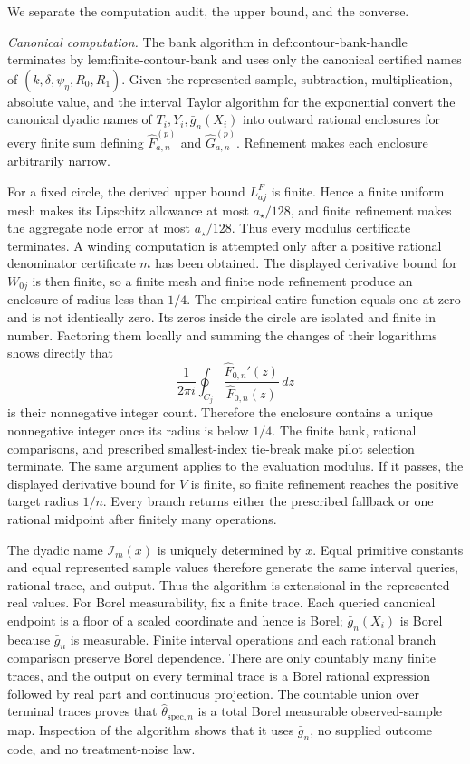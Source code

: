 We separate the computation audit, the upper bound, and the converse.

\emph{Canonical computation.}  The bank algorithm in \(\text{def:contour-bank-handle}\) terminates by \(\text{lem:finite-contour-bank}\) and uses only the canonical certified names of \((k,\delta,\psi_{\eta},R_0,R_1)\).  Given the represented sample, subtraction, multiplication, absolute value, and the interval Taylor algorithm for the exponential convert the canonical dyadic names of \(T_i,Y_i,\bar g_n(X_i)\) into outward rational enclosures for every finite sum defining \(\widehat F_{a,n}^{(p)}\) and \(\widehat G_{a,n}^{(p)}\).  Refinement makes each enclosure arbitrarily narrow.

For a fixed circle, the derived upper bound \(L^F_{aj}\) is finite.  Hence a finite uniform mesh makes its Lipschitz allowance at most \(a_{\star}/128\), and finite refinement makes the aggregate node error at most \(a_{\star}/128\).  Thus every modulus certificate terminates.  A winding computation is attempted only after a positive rational denominator certificate \(m\) has been obtained.  The displayed derivative bound for \(W_{0j}\) is then finite, so a finite mesh and finite node refinement produce an enclosure of radius less than \(1/4\).  The empirical entire function equals one at zero and is not identically zero.  Its zeros inside the circle are isolated and finite in number.  Factoring them locally and summing the changes of their logarithms shows directly that
\[
 \frac1{2\pi i}\oint_{C_j}
 \frac{\widehat F_{0,n}'(z)}{\widehat F_{0,n}(z)}\,dz
\]
is their nonnegative integer count.  Therefore the enclosure contains a unique nonnegative integer once its radius is below \(1/4\).  The finite bank, rational comparisons, and prescribed smallest-index tie-break make pilot selection terminate.  The same argument applies to the evaluation modulus.  If it passes, the displayed derivative bound for \(V\) is finite, so finite refinement reaches the positive target radius \(1/n\).  Every branch returns either the prescribed fallback or one rational midpoint after finitely many operations.

The dyadic name \(\mathcal I_m(x)\) is uniquely determined by \(x\).  Equal primitive constants and equal represented sample values therefore generate the same interval queries, rational trace, and output.  Thus the algorithm is extensional in the represented real values.  For Borel measurability, fix a finite trace.  Each queried canonical endpoint is a floor of a scaled coordinate and hence is Borel; \(\bar g_n(X_i)\) is Borel because \(\bar g_n\) is measurable.  Finite interval operations and each rational branch comparison preserve Borel dependence.  There are only countably many finite traces, and the output on every terminal trace is a Borel rational expression followed by real part and continuous projection.  The countable union over terminal traces proves that \(\widehat\theta_{\mathrm{spec},n}\) is a total Borel measurable observed-sample map.  Inspection of the algorithm shows that it uses \(\bar g_n\), no supplied outcome code, and no treatment-noise law.

